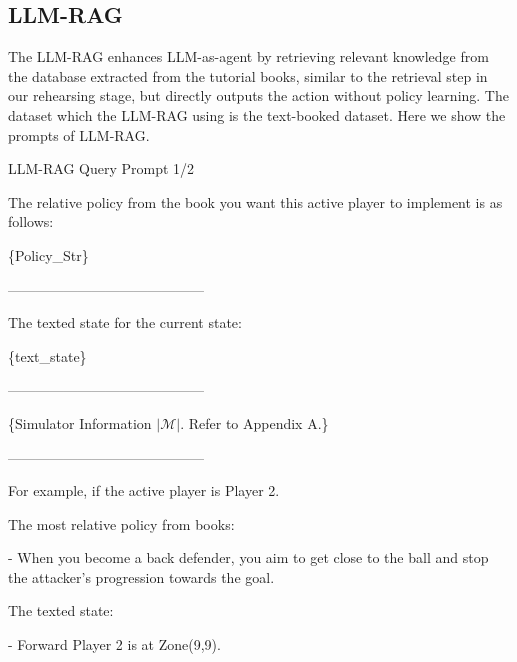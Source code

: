 \subsection{LLM-RAG}
 The LLM-RAG enhances LLM-as-agent by retrieving relevant knowledge from the database extracted from the tutorial books, similar to the retrieval step in our rehearsing stage, but directly outputs the action without policy learning. The dataset which the LLM-RAG using is the text-booked dataset. Here we show the prompts of LLM-RAG.
 


\begin{gbox}{LLM-RAG Query Prompt 1/2} 

The relative policy from the book you want this active player to implement is as follows:

\hspace{3mm}

\hspace{3mm} \{Policy\_Str\}

------------------------------------------

The texted state for the current state:

\hspace{3mm}

\hspace{3mm} \{text\_state\}

------------------------------------------


\{Simulator Information $|\mathcal{M}|$. Refer to Appendix A.\}


------------------------------------------

\hspace{3mm}


For example, if the active player is Player 2.


\hspace{3mm}

The most relative policy from books:


\hspace{3mm}

- When you become a back defender, you aim to get close to the ball and stop the attacker's progression towards the goal.


\hspace{3mm}

The texted state:

\hspace{5mm}

- Forward Player 2 is at Zone(9,9).



\end{gbox}
